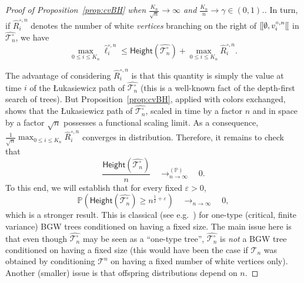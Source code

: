 \documentclass[10pt]{amsart}
\theoremstyle{definition}\newtheorem{defi}[theo]{Definition}\newtheorem{rema}[theo]{Remark}\newtheorem{exam}[theo]{Example}\newtheorem{exem}[theo]{Example}\newtheorem{nota}[theo]{Notation}
\renewcommand{\P}{\mathbb{P}}
\def\Ts{\mathscr{T}}
\renewcommand{\epsilon}{\varepsilon}
\renewcommand\Pr[1]{\mathbb{P}\left(#1\right)}
\def\llbracket{[\hspace{-.10em} [ }
\begin{document}
\begin{proof}[Proof of  Proposition~\ref{prop:cvBH}  when $\tfrac{K_{n}}{\sqrt{n}} \rightarrow \infty$ and $ \tfrac{K_{n}}{n}  \rightarrow \gamma \in (0,1)$.]
In turn, if $\hat{R}^{\circ,n}_{i}$ denotes the number of white \emph{vertices}  branching on the right of  $\llbracket \emptyset, v^{\circ,n}_{i} \llbracket$ in $\hat{\Ts^{\circ}_{n}}$, we have
\[\max_{0 \leq i  \leq K_{n}} \hat{\ell}^{\circ,n}_{i} \leq \mathsf{Height}(\hat{\Ts^{\circ}_{n}})+ \max_{0 \leq i  \leq K_{n}} \hat{R}^{\circ,n}_{i}.\]


The advantage of considering  $\hat{R}^{\circ,n}_{i}$ is that this quantity is simply the value at time $i$ of the {\L}ukasiewicz path of $\hat{\Ts^{\circ}_{n}}$ (this  is a well-known fact of the depth-first search of trees). But Proposition~\ref{prop:cvBH}, applied with colors exchanged, shows that  the {\L}ukasiewicz path of $\hat{\Ts^{\circ}_{n}}$, scaled in time by a factor $n$ and in space by a factor $\sqrt{n}$ possesses a functional scaling limit. As a consequence, $\tfrac{1}{\sqrt{n}} \max_{0 \leq i \leq  K_{n}} \hat{R}^{\circ,n}_{i}$ converges in distribution. Therefore, it remains to check that
\[\frac{\mathsf{Height}(\hat{\Ts^{\circ}_{n}})}{n}  \quad \mathop{\longrightarrow}^{(\P)}_{n \rightarrow \infty} \quad 0.\]
To this end, we will establish that for every fixed $\epsilon>0$,
\begin{equation}
\label{eq:height}\Pr{\mathsf{Height}(\hat{\Ts^{\circ}_{n}}) \geq n^{ \tfrac{1}{2} +\epsilon}}   \quad \mathop{\longrightarrow}_{n \rightarrow \infty} \quad 0,
\end{equation}
which is a stronger result. This is classical (see e.g.~\cite{BK00,MM03}) for one-type (critical, finite variance) BGW trees conditioned on having a fixed size. The main issue here is that even though $\hat{\Ts^{\circ}_{n}}$ may be seen as a ``one-type tree'', $\hat{\Ts^{\circ}_{n}}$ is \emph{not} a BGW tree conditioned on having a fixed size (this would have been the case if $\Ts_{n}$ was obtained by  conditioning $\Ts^{n}$ on having a fixed number of white vertices only). Another (smaller) issue is that  offspring distributions depend on $n$.



\end{proof}
\end{document}
